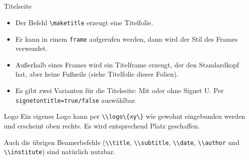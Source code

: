 \documentclass[german,10pt,xcolor=colortbl,compress
]{beamer}
\begin{document}
\subsection*{}
\begin{frame}[fragile]{Titelseite}
	\begin{itemize}
		\item Der Befehl \lstinline|\maketitle| erzeugt eine Titelfolie.

		\item Er kann in einem \lstinline|frame| aufgerufen werden, dann wird der Stil des Frames verwendet.

		\item Außerhalb eines Frames wird ein Titelframe erzeugt, der den Standardkopf hat, aber keine Fußzeile (siehe Titelfolie dieser Folien).

		\item Es gibt zwei Varianten für die Titelseite: Mit oder ohne Signet U. Per \lstinline|signetontitle=true/false| auswählbar.
	\end{itemize}
\end{frame}
\begin{frame}{Logo}
	Ein eigenes Logo kann per \lstinline|\\logo\{xy\}| wie gewohnt eingebunden werden und erscheint oben rechts. Es wird entsprechend Platz geschaffen.\par
	Auch die übrigen Beamerbefehle (\lstinline|\\title|, \lstinline|\\subtitle|, \lstinline|\\date|, \lstinline|\\author| und \lstinline|\\institute|) sind natürlich nutzbar.
\end{frame}
\logo{}
\end{document}
